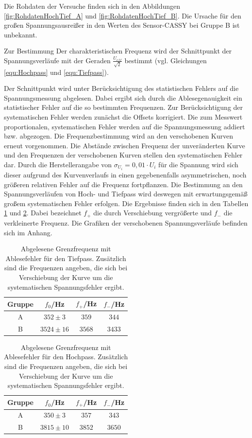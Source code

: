 \documentclass[12pt,a4paper]{article}
\begin{document}
Die Rohdaten der Versuche finden sich in den Abbildungen \ref{fig:RohdatenHochTief_A} und \ref{fig:RohdatenHochTief_B}.
Die Ursache für den großen Spannungsausreißer in den Werten des Sensor-CASSY bei Gruppe B ist unbekannt.

Zur Bestimmung Der charakteristischen Frequenz wird der Schnittpunkt der Spannungsverläufe mit der Geraden $\frac{U_{eff}}{\sqrt{2}}$ bestimmt (vgl. Gleichungen \ref{equ:Hochpass} und \ref{equ:Tiefpass}).

Der Schnittpunkt wird unter Berücksichtigung des statistischen Fehlers auf die Spannungsmessung abgelesen. Dabei ergibt sich durch die Ablesegenauigkeit ein statistischer Fehler auf die so bestimmten Frequenzen.
Zur Berücksichtigung der systematischen Fehler werden zunächst die Offsets korrigiert. Die zum Messwert proportionalen, systematischen Fehler werden auf die Spannungsmessung addiert bzw. abgezogen. 
Die Frequenzbestimmung wird an den verschobenen Kurven erneut vorgenommen. Die Abstände zwischen Frequenz der unveränderten Kurve und den Frequenzen der verschobenen Kurven stellen den systematischen Fehler dar. Durch die Herstellerangabe von $\sigma_{U_i} = 0,01 \cdot U_i$ für die Spannung wird sich dieser aufgrund des Kurvenverlaufs in einen gegebenenfalls asymmetrischen, noch größeren relativen Fehler auf die Frequenz fortpflanzen. Die Bestimmung an den Spannungsverläufen von Hoch- und Tiefpass wird deswegen mit erwartungsgemäß großem systematischen Fehler erfolgen. Die Ergebnisse finden sich in den Tabellen \ref{tab:Tiefpass} und \ref{tab:Hochpass}. Dabei bezeichnet $f_+$ die durch Verschiebung vergrößerte und $f_-$ die verkleinerte Frequenz. Die Grafiken der verschobenen Spannungsverläufe befinden sich im Anhang.

\begin{table}
\centering
\begin{tabular}{|c|c|c|c|}
\hline
Gruppe & $f_0$/Hz & $f_{+}$/Hz & $f_{-}$/Hz \\
\hline
A & $352 \pm 3 $ & $359$ & $344$ \\
\hline
B & $3524 \pm 16$ & $3568$ & $3433$ \\
\hline
\end{tabular}
\caption{Abgelesene Grenzfrequenz mit Ablesefehler für den Tiefpass. Zusätzlich sind die Frequenzen angeben, die sich bei Verschiebung der Kurve um die systematischen Spannungsfehler ergibt.}
\label{tab:Tiefpass}
\end{table}


\begin{table}
\centering
\begin{tabular}{|c|c|c|c|}
\hline
Gruppe & $f_0$/Hz & $f_{+}$/Hz & $f_{-}$/Hz \\
\hline
A & $350 \pm 3 $ & $357$ & $343$ \\
\hline
B & $3815 \pm 10 $ & $3852$ & $3650$ \\
\hline
\end{tabular}
\caption{Abgelesene Grenzfrequenz mit Ablesefehler für den Hochpass. Zusätzlich sind die Frequenzen angeben, die sich bei Verschiebung der Kurve um die systematischen Spannungsfehler ergibt.}
\label{tab:Hochpass}
\end{table}
\end{document}
